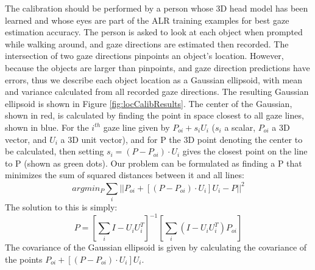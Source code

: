 \documentclass{ut-thesis}
\begin{document}
The calibration should be performed by a person whose 3D head model has been learned and whose eyes are part of the ALR training examples for best gaze estimation accuracy.  The person is asked to look at each object when prompted while walking around, and gaze directions are estimated then recorded.  The intersection of two gaze directions pinpoints an object's location.  However, because the objects are larger than pinpoints, and gaze direction predictions have errors, thus we describe each object location as a Gaussian ellipsoid, with mean and variance calculated from all recorded gaze directions.  The resulting Gaussian ellipsoid is shown in Figure \ref{fig:locCalibResults}.  The center of the Gaussian, shown in red, is calculated by finding the point in space closest to all gaze lines, shown in blue.  For the \(i^{th}\) gaze line given by \(P_{oi} + s_i U_i\) (\(s_i\) a scalar, \(P_{oi}\) a 3D vector, and \(U_i\) a 3D unit vector), and for P the 3D point denoting the center to be calculated, then setting \(s_i = (P - P_{oi})\cdot{U_i} \) gives the closest point on the line to P (shown as green dots).  Our problem can be formulated as finding a P that minimizes the sum of squared distances between it and all lines:
\[ argmin_P \sum_{i}^{} || P_{oi} + [(P - P_{oi})\cdot{U_i}]U_i - P ||^2 \]
The solution to this is simply:
\[ P = [ \sum_{i}^{} I - U_i U_i^T ]^{-1}  [ \sum_{i}^{}(I - U_i U_i^T)P_{oi} ]   \]
The covariance of the Gaussian ellipsoid is given by calculating the covariance of the points \(P_{oi} + [(P - P_{oi})\cdot{U_i}]U_i\).
\end{document}
